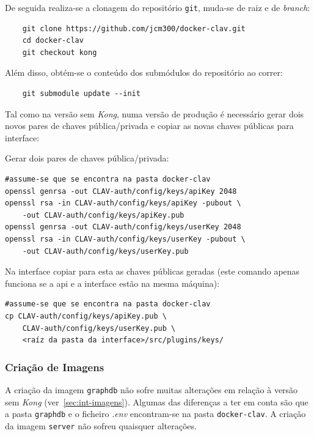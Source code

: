 De seguida realiza-se a clonagem do repositório \texttt{git}, muda-se de raiz e de \textit{branch}:

\footnotesize
\begin{verbatim}
    git clone https://github.com/jcm300/docker-clav.git
    cd docker-clav
    git checkout kong
\end{verbatim}
\normalsize

Além disso, obtém-se o conteúdo dos submódulos do repositório ao correr:

\footnotesize
\begin{verbatim}
    git submodule update --init
\end{verbatim}
\normalsize

Tal como na versão sem \textit{Kong}, numa versão de produção é necessário gerar dois novos pares de chaves pública/privada e copiar as novas chaves públicas para interface:

\footnotesize
\begin{center}
\begin{minipage}[t]{0.49\textwidth}
Gerar dois pares de chaves pública/privada:
\begin{verbatim}
#assume-se que se encontra na pasta docker-clav 
openssl genrsa -out CLAV-auth/config/keys/apiKey 2048
openssl rsa -in CLAV-auth/config/keys/apiKey -pubout \
    -out CLAV-auth/config/keys/apiKey.pub
openssl genrsa -out CLAV-auth/config/keys/userKey 2048
openssl rsa -in CLAV-auth/config/keys/userKey -pubout \
    -out CLAV-auth/config/keys/userKey.pub
\end{verbatim}
\end{minipage}%
\begin{minipage}[t]{0.49\textwidth}
Na interface copiar para esta as chaves públicas geradas (este comando apenas funciona se a \acrshort{api} e a interface estão na mesma máquina):
\begin{verbatim}
#assume-se que se encontra na pasta docker-clav 
cp CLAV-auth/config/keys/apiKey.pub \
    CLAV-auth/config/keys/userKey.pub \
    <raíz da pasta da interface>/src/plugins/keys/
\end{verbatim}
\end{minipage}
\end{center}
\normalsize

\subsubsection{Criação de Imagens}

A criação da imagem \texttt{graphdb} não sofre muitas alterações em relação à versão sem \textit{Kong} (ver~\ref{sec:int-imagens}). Algumas das diferenças a ter em conta são que a pasta \texttt{graphdb} e o ficheiro \textit{.env} encontram-se na pasta \texttt{docker-clav}. A criação da imagem \texttt{server} não sofreu quaisquer alterações.

